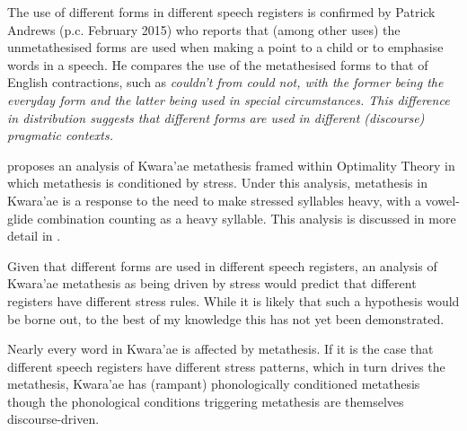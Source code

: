 The use of different forms in different speech registers is confirmed by Patrick Andrews
(p.c. February 2015)
who reports that (among other uses) the unmetathesised forms
are used when making a point to a child or to emphasise words in a speech.
He compares the use of the metathesised forms to that of English contractions,
such as \it{couldn't} from \it{could not},
with the former being the everyday form and the latter being used in special circumstances.
This difference in distribution suggests that different forms
are used in different (discourse) pragmatic contexts.

\cite{he04} proposes an analysis of Kwara'ae metathesis framed within Optimality Theory
in which metathesis is conditioned by stress.
Under this analysis, metathesis in Kwara'ae is a response
to the need to make stressed syllables heavy,
with a vowel-glide combination counting as a heavy syllable.
This analysis is discussed in more detail in .

Given that different forms are used in different speech registers,
an analysis of Kwara'ae metathesis as being driven by stress
would predict that different registers have different stress rules.
While it is likely that such a hypothesis would be borne out,
to the best of my knowledge this has not yet been demonstrated.

Nearly every word in Kwara'ae is affected by metathesis.
If it is the case that different speech registers have
different stress patterns, which in turn drives the metathesis,
Kwara'ae has (rampant) phonologically conditioned metathesis
though the phonological conditions triggering metathesis
are themselves discourse-driven.